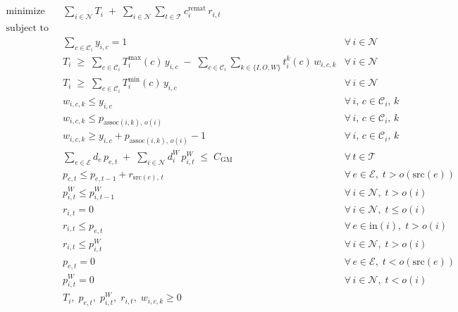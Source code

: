 \documentclass{article}
\begin{document}
\[
\begin{aligned}
\text{minimize} \quad
  & \sum_{i \in \mathcal{N}} T_i
  \;+\; \sum_{i \in \mathcal{N}} \sum_{t \in \mathcal{T}} c_i^{\text{remat}}\, r_{i,t} \\[6pt]
%
\text{subject to} \\[4pt]
%
  & \sum_{c \in \mathcal{C}_i} y_{i,c} = 1
  & \forall\, i \in \mathcal{N} \\[4pt]
%
  & T_i \;\geq\; \sum_{c \in \mathcal{C}_i} T_i^{\max}(c)\, y_{i,c}
    \;-\; \sum_{c \in \mathcal{C}_i} \sum_{k \in \{I,O,W\}} t_i^k(c)\, w_{i,c,k}
  & \forall\, i \in \mathcal{N} \\[4pt]
%
  & T_i \;\geq\; \sum_{c \in \mathcal{C}_i} T_i^{\min}(c)\, y_{i,c}
  & \forall\, i \in \mathcal{N} \\[4pt]
%
  & w_{i,c,k} \leq y_{i,c}
  & \forall\, i,\, c \in \mathcal{C}_i,\, k \\[2pt]
  & w_{i,c,k} \leq p_{\text{assoc}(i,k),\, o(i)}
  & \forall\, i,\, c \in \mathcal{C}_i,\, k \\[2pt]
  & w_{i,c,k} \geq y_{i,c} + p_{\text{assoc}(i,k),\, o(i)} - 1
  & \forall\, i,\, c \in \mathcal{C}_i,\, k \\[4pt]
%
  & \sum_{e \in \mathcal{E}} d_e\, p_{e,t}
    \;+\; \sum_{i \in \mathcal{N}} d_i^W\, p_{i,t}^W
    \;\leq\; C_{\text{GM}}
  & \forall\, t \in \mathcal{T} \\[4pt]
%
  & p_{e,t} \leq p_{e,t-1} + r_{\text{src}(e),\, t}
  & \forall\, e \in \mathcal{E},\; t > o(\text{src}(e)) \\[4pt]
%
  & p_{i,t}^W \leq p_{i,t-1}^W
  & \forall\, i \in \mathcal{N},\; t > o(i) \\[4pt]
%
  & r_{i,t} = 0
  & \forall\, i \in \mathcal{N},\; t \leq o(i) \\[4pt]
%
  & r_{i,t} \leq p_{e,t}
  & \forall\, e \in \text{in}(i),\; t > o(i) \\[4pt]
%
  & r_{i,t} \leq p_{i,t}^W
  & \forall\, i \in \mathcal{N},\; t > o(i) \\[4pt]
%
  & p_{e,t} = 0
  & \forall\, e \in \mathcal{E},\; t < o(\text{src}(e)) \\[2pt]
  & p_{i,t}^W = 0
  & \forall\, i \in \mathcal{N},\; t < o(i) \\[4pt]
%
  & T_i,\; p_{e,t},\; p_{i,t}^W,\; r_{i,t},\; w_{i,c,k} \geq 0
\end{aligned}
\]
\end{document}
